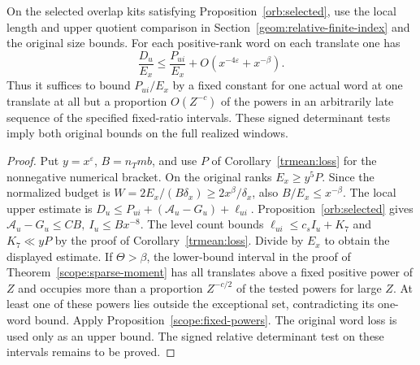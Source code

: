 \begin{corollary}
\label{scope:signed-word-alone}
On the selected overlap kits satisfying Proposition~\ref{orb:selected},
use the local length and upper quotient comparison in
Section~\ref{geom:relative-finite-index} and the original size bounds.
For each positive-rank word on each translate one has
\[
        \frac{D_u}{E_x}\le\frac{P_{ui}}{E_x}
                  +O(x^{-4\varepsilon}+x^{-\beta}).
\]
Thus it suffices to bound \(P_{ui}/E_x\) by a fixed constant for
one actual word at one translate at all but a proportion \(O(Z^{-c})\)
of the powers in an arbitrarily late sequence of the specified
fixed-ratio intervals. These signed determinant tests imply both
original bounds on the full realized windows.
\end{corollary}
\begin{proof}
Put \(y=x^\varepsilon\), \(B=n_Tmb\), and use \(P\) of
Corollary~\ref{trmean:loss} for the nonnegative numerical bracket.
On the original ranks \(E_x\ge y^5 P\). Since the normalized
budget is \(W=2E_x/(B\delta_x)\ge 2x^\beta/\delta_x\), also
\(B/E_x\le x^{-\beta}\).
The local upper estimate is
\(D_u\le P_{ui}+(\mathcal A_u-G_u)+\ell_{ui}\).
Proposition~\ref{orb:selected} gives
\(\mathcal A_u-G_u\le CB,\ I_u\le Bx^{-8}\).
The level count bounds \(\ell_{ui}\le c_s I_u+K_7\) and
\(K_7\ll yP\) by the proof of Corollary~\ref{trmean:loss}.
Divide by \(E_x\) to obtain the displayed estimate. If
\(\Theta>\beta\), the lower-bound interval in the proof of
Theorem~\ref{scope:sparse-moment} has all translates above a fixed
positive power of \(Z\) and occupies more than a proportion
\(Z^{-c/2}\) of the tested powers for large \(Z\).
At least one of these powers lies outside the exceptional set,
contradicting its one-word bound. Apply Proposition~\ref{scope:fixed-powers}.
The original word loss is used only as an upper bound. The signed
relative determinant test on these intervals remains to be proved.
\end{proof}

